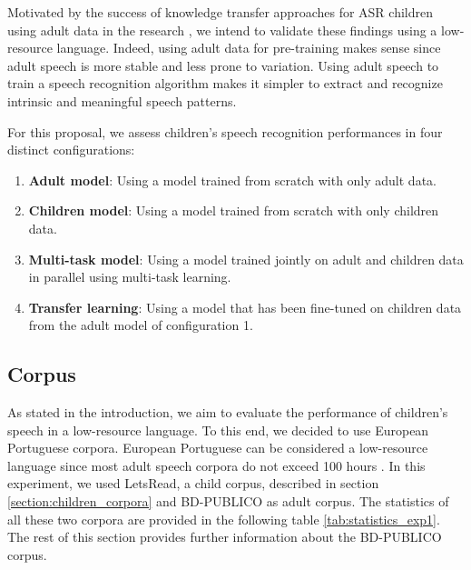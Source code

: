 Motivated by the success of knowledge transfer approaches for ASR children using adult data in the research \cite{TFchildren,TransferLF,2019multi}, we intend to validate these findings using a low-resource language. Indeed, using adult data for pre-training makes sense since adult speech is more stable and less prone to variation. Using adult speech to train a speech recognition algorithm makes it simpler to extract and recognize intrinsic and meaningful speech patterns.

For this proposal, we assess children's speech recognition performances in four distinct configurations:
\begin{enumerate}
    \item \textbf{Adult model}: Using a model trained from scratch with only adult data.
    \item \textbf{Children model}: Using a model trained from scratch with only children data.
    \item \textbf{Multi-task model}: Using a model trained jointly on adult and children data in parallel using multi-task learning.
    \item \textbf{Transfer learning}: Using a model that has been fine-tuned on children data from the adult model of configuration 1.
\end{enumerate}

\subsection{Corpus}
\label{sec:corpus}
As stated in the introduction, we aim to evaluate the performance of children's speech in a low-resource language. To this end, we decided to use European Portuguese corpora. European Portuguese can be considered a low-resource language since most adult speech corpora do not exceed 100 hours \cite{tribus}.
In this experiment, we used LetsRead, a child corpus, described in section \ref{section:children_corpora} and BD-PUBLICO as adult corpus. %
The statistics of all these two corpora are provided in the following table \ref{tab:statistics_exp1}. The rest of this section provides further information about the BD-PUBLICO corpus.%


